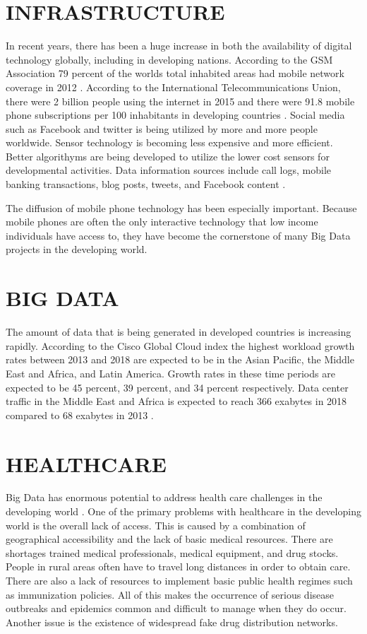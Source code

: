 \documentclass[sigconf]{acmart}
\begin{document}
\section{INFRASTRUCTURE}
In recent years, there has been a huge increase in both the availability of digital technology globally, including in developing nations. According to the GSM Association 79 percent of the worlds total inhabited areas had mobile network coverage in 2012 \cite{DevEcon}. According to the International Telecommunications Union, there were 2 billion people using the internet in 2015 and there were 91.8 mobile phone subscriptions per 100 inhabitants in developing countries \cite{DevEcon}.  Social media such as Facebook and twitter is being utilized by more and more people worldwide. Sensor technology is becoming less expensive and more efficient. Better algorithyms are being developed to utilize the lower cost sensors for developmental activities. Data information sources include call logs, mobile banking transactions, blog posts, tweets, and Facebook content \cite{www-google-GloPls}.

The diffusion of mobile phone technology has been especially important.  Because mobile phones are often the only interactive technology that low income individuals have access to, they have become the cornerstone of many Big Data projects in the developing world.

\section{BIG DATA}
The amount of data that is being generated in developed countries is increasing rapidly.  According to the Cisco Global Cloud index the highest workload growth rates between 2013 and 2018 are expected to be in the Asian Pacific, the Middle East and Africa, and Latin America.  Growth rates in these time periods are expected to be 45 percent, 39 percent, and 34 percent respectively.  Data center traffic in the Middle East and Africa is expected to reach 366 exabytes in 2018 compared to 68 exabytes in 2013 \cite{DevEcon}. 

\section{HEALTHCARE}

Big Data has enormous potential to address health care challenges in the developing world \cite{DevEcon}. One of the primary problems with healthcare in the developing world is the overall lack of access. This is caused by a combination of geographical accessibility and the lack of basic medical resources. There are shortages trained medical professionals, medical equipment, and drug stocks. People in rural areas often have to travel long distances in order to obtain care. There are also a lack of resources to implement basic public health regimes such as immunization policies.  All of this makes the occurrence of serious disease outbreaks and epidemics common and difficult to manage when they do occur.  Another issue is the existence of widespread fake drug distribution networks.
\end{document}
